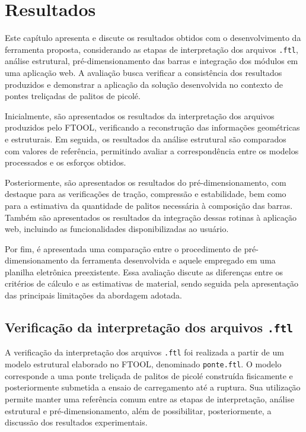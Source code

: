 \chapter{Resultados}
\label{cap:resultados}

Este capítulo apresenta e discute os resultados obtidos com o desenvolvimento da ferramenta proposta, considerando as etapas de interpretação dos arquivos \texttt{.ftl}, análise estrutural, pré-dimensionamento das barras e integração dos módulos em uma aplicação web. A avaliação busca verificar a consistência dos resultados produzidos e demonstrar a aplicação da solução desenvolvida no contexto de pontes treliçadas de palitos de picolé.

Inicialmente, são apresentados os resultados da interpretação dos arquivos produzidos pelo \acrshort{FTOOL}, verificando a reconstrução das informações geométricas e estruturais. Em seguida, os resultados da análise estrutural são comparados com valores de referência, permitindo avaliar a correspondência entre os modelos processados e os esforços obtidos.

Posteriormente, são apresentados os resultados do pré-dimensionamento, com destaque para as verificações de tração, compressão e estabilidade, bem como para a estimativa da quantidade de palitos necessária à composição das barras. Também são apresentados os resultados da integração dessas rotinas à aplicação web, incluindo as funcionalidades disponibilizadas ao usuário.

Por fim, é apresentada uma comparação entre o procedimento de pré-dimensionamento da ferramenta desenvolvida e aquele empregado em uma planilha eletrônica preexistente. Essa avaliação discute as diferenças entre os critérios de cálculo e as estimativas de material, sendo seguida pela apresentação das principais limitações da abordagem adotada.

\section{Verificação da interpretação dos arquivos \texttt{.ftl}}
\label{sec:resultados-parser}

A verificação da interpretação dos arquivos \texttt{.ftl} foi realizada a partir de um modelo estrutural elaborado no \acrshort{FTOOL}, denominado \texttt{ponte.ftl}. O modelo corresponde a uma ponte treliçada de palitos de picolé construída fisicamente e posteriormente submetida a ensaio de carregamento até a ruptura. Sua utilização permite manter uma referência comum entre as etapas de interpretação, análise estrutural e pré-dimensionamento, além de possibilitar, posteriormente, a discussão dos resultados experimentais.

